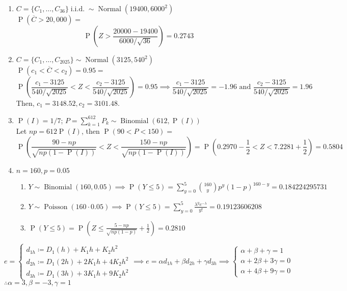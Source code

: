 \documentclass{article}
\newcommand{\set}[1]{\{#1\}}
\newcommand{\pr}[1]{\operatorname{P}\left(#1\right)}
\newcommand{\iid}{\operatorname{i.i.d.}}
\newcommand{\binomdist}[3]{#1 \sim \operatorname{Binomial}(#2, #3)}
\newcommand{\poisson}[2]{#1 \sim \operatorname{Poisson}(#2)}
\newcommand{\normdist}[3]{#1 \sim \operatorname{Normal}(#2, #3)}
\begin{document}
\begin{enumerate}
  \item $C=\normdist{\set{C_1, \ldots, C_{36}} \iid}{19400}{6000^2}$\\
  $\pr{\overline{C}> 20,000} = $ \[
    \pr{Z > \frac{20000-19400}{6000/\sqrt{36}}} = 0.2743
  \]

  \item $C = \normdist{\set{C_1, \ldots, C_{2025}}}{3125}{540^2}$\\
  $\pr{c_1 < \overline{C} < c_2} = 0.95 = $ \[
    \pr{\frac{c_1 - 3125}{540/\sqrt{2025}} < Z < \frac{c_2 - 3125}{540/\sqrt{2025}}} = 0.95 \implies 
    \frac{c_1 - 3125}{540/\sqrt{2025}} = -1.96 \text{ and }
    \frac{c_2 - 3125}{540/\sqrt{2025}} = 1.96
  \]
  Then, $c_1 = 3148.52, c_2 = 3101.48$.

  \item $\pr{I} = 1/7$; $P = \binomdist{\sum_{k=1}^{612}P_k}{612}{\pr{I}}$\\
  Let $np = 612\pr{I}$, then $\pr{90 < P < 150} = $ \[
    \pr{\frac{90 - np}{\sqrt{np(1-\pr{I})}} < Z < \frac{150 - np}{\sqrt{np(1-\pr{I})}}}
    = \pr{0.2970 - \frac{1}{2} < Z < 7.2281 + \frac{1}{2}} = 0.5804
  \]

  \item $n = 160, p = 0.05$ 
  \begin{enumerate}
    \item $\binomdist{Y}{160}{0.05} 
    \implies \pr{Y \leq 5} = \sum_{y=0}^{5}\binom{160}{y}p^{y}(1-p)^{160-y} = 0.184224295731$
    \item $\poisson{Y}{160 \cdot 0.05} 
    \implies \pr{Y \leq 5} = \sum_{y=0}^{5}\frac{\lambda^{y}e^{-\lambda}}{y!} = 0.19123606208$
    \item $\pr{Y \leq 5} = \pr{Z \leq \frac{5 - np}{\sqrt{np(1-p)}} + \frac{1}{2}} = 0.2810$
  \end{enumerate}
\end{enumerate}

\[
  e = \begin{cases}
    d_{1h}\coloneq D_1(h) + K_1h + K_2h^2\\
    d_{2h}\coloneq D_1(2h) + 2K_1h + 4K_2h^2\\
    d_{3h}\coloneq D_1(3h) + 3K_1h + 9K_2h^2
  \end{cases} 
  \implies e = \alpha d_{1h} + \beta d_{2h} + \gamma d_{3h}
  \implies \begin{cases}
    \alpha + \beta + \gamma = 1\\
    \alpha + 2\beta + 3\gamma = 0\\
    \alpha + 4\beta + 9\gamma = 0
  \end{cases}
\]
$\therefore \alpha = 3, \beta = -3, \gamma = 1$
\end{document}
